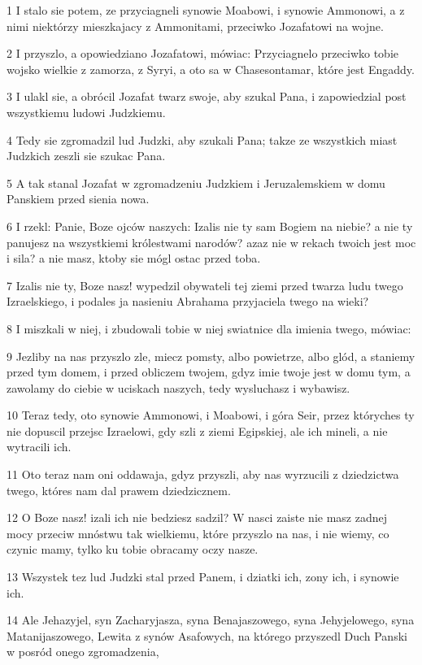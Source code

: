 \par 1 I stalo sie potem, ze przyciagneli synowie Moabowi, i synowie Ammonowi, a z nimi niektórzy mieszkajacy z Ammonitami, przeciwko Jozafatowi na wojne.
\par 2 I przyszlo, a opowiedziano Jozafatowi, mówiac: Przyciagnelo przeciwko tobie wojsko wielkie z zamorza, z Syryi, a oto sa w Chasesontamar, które jest Engaddy.
\par 3 I ulakl sie, a obrócil Jozafat twarz swoje, aby szukal Pana, i zapowiedzial post wszystkiemu ludowi Judzkiemu.
\par 4 Tedy sie zgromadzil lud Judzki, aby szukali Pana; takze ze wszystkich miast Judzkich zeszli sie szukac Pana.
\par 5 A tak stanal Jozafat w zgromadzeniu Judzkiem i Jeruzalemskiem w domu Panskiem przed sienia nowa.
\par 6 I rzekl: Panie, Boze ojców naszych: Izalis nie ty sam Bogiem na niebie? a nie ty panujesz na wszystkiemi królestwami narodów? azaz nie w rekach twoich jest moc i sila? a nie masz, ktoby sie mógl ostac przed toba.
\par 7 Izalis nie ty, Boze nasz! wypedzil obywateli tej ziemi przed twarza ludu twego Izraelskiego, i podales ja nasieniu Abrahama przyjaciela twego na wieki?
\par 8 I miszkali w niej, i zbudowali tobie w niej swiatnice dla imienia twego, mówiac:
\par 9 Jezliby na nas przyszlo zle, miecz pomsty, albo powietrze, albo glód, a staniemy przed tym domem, i przed obliczem twojem, gdyz imie twoje jest w domu tym, a zawolamy do ciebie w uciskach naszych, tedy wysluchasz i wybawisz.
\par 10 Teraz tedy, oto synowie Ammonowi, i Moabowi, i góra Seir, przez któryches ty nie dopuscil przejsc Izraelowi, gdy szli z ziemi Egipskiej, ale ich mineli, a nie wytracili ich.
\par 11 Oto teraz nam oni oddawaja, gdyz przyszli, aby nas wyrzucili z dziedzictwa twego, któres nam dal prawem dziedzicznem.
\par 12 O Boze nasz! izali ich nie bedziesz sadzil? W nasci zaiste nie masz zadnej mocy przeciw mnóstwu tak wielkiemu, które przyszlo na nas, i nie wiemy, co czynic mamy, tylko ku tobie obracamy oczy nasze.
\par 13 Wszystek tez lud Judzki stal przed Panem, i dziatki ich, zony ich, i synowie ich.
\par 14 Ale Jehazyjel, syn Zacharyjasza, syna Benajaszowego, syna Jehyjelowego, syna Matanijaszowego, Lewita z synów Asafowych, na którego przyszedl Duch Panski w posród onego zgromadzenia,
